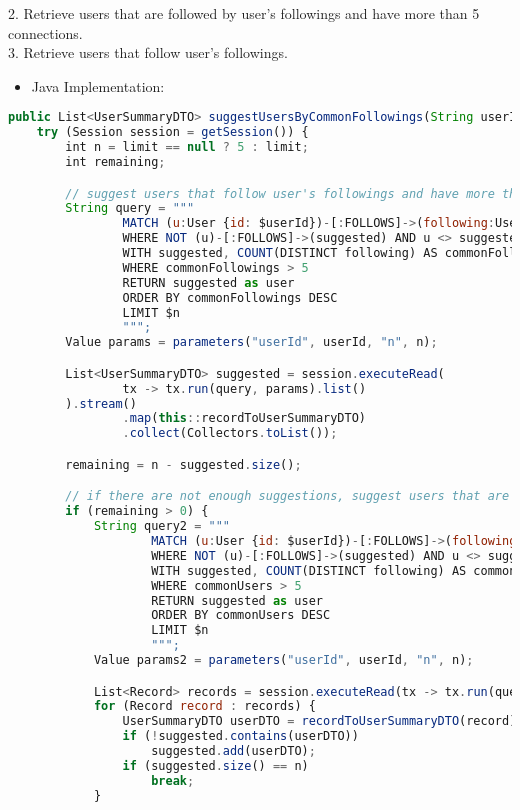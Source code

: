 2. Retrieve users that are followed by user's followings and have more than 5 connections.\\
3. Retrieve users that follow user's followings.\\
\begin{itemize}
    \item Java Implementation:
\end{itemize}
\begin{lstlisting}[language=JavaScript]
public List<UserSummaryDTO> suggestUsersByCommonFollowings(String userId, Integer limit) throws DAOException {
    try (Session session = getSession()) {
        int n = limit == null ? 5 : limit;
        int remaining;

        // suggest users that follow user's followings and have more than 5 common followings
        String query = """
                MATCH (u:User {id: $userId})-[:FOLLOWS]->(following:User)<-[:FOLLOWS]-(suggested:User)
                WHERE NOT (u)-[:FOLLOWS]->(suggested) AND u <> suggested
                WITH suggested, COUNT(DISTINCT following) AS commonFollowings
                WHERE commonFollowings > 5
                RETURN suggested as user
                ORDER BY commonFollowings DESC
                LIMIT $n
                """;
        Value params = parameters("userId", userId, "n", n);

        List<UserSummaryDTO> suggested = session.executeRead(
                tx -> tx.run(query, params).list()
        ).stream()
                .map(this::recordToUserSummaryDTO)
                .collect(Collectors.toList());

        remaining = n - suggested.size();

        // if there are not enough suggestions, suggest users that are followed by the user's followings and have more than 5 connections
        if (remaining > 0) {
            String query2 = """
                    MATCH (u:User {id: $userId})-[:FOLLOWS]->(following:User)-[:FOLLOWS]->(suggested:User)
                    WHERE NOT (u)-[:FOLLOWS]->(suggested) AND u <> suggested
                    WITH suggested, COUNT(DISTINCT following) AS commonUsers
                    WHERE commonUsers > 5
                    RETURN suggested as user
                    ORDER BY commonUsers DESC
                    LIMIT $n
                    """;
            Value params2 = parameters("userId", userId, "n", n);

            List<Record> records = session.executeRead(tx -> tx.run(query2, params2).list());
            for (Record record : records) {
                UserSummaryDTO userDTO = recordToUserSummaryDTO(record);
                if (!suggested.contains(userDTO))
                    suggested.add(userDTO);
                if (suggested.size() == n)
                    break;
            }


\end{lstlisting}
